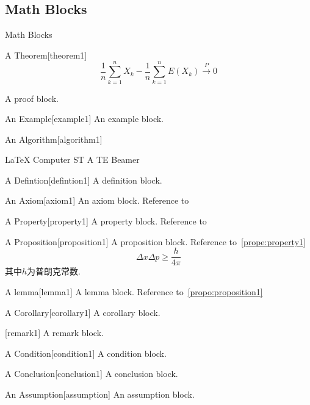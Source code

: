 \documentclass[hyperref, UTF8, CJK]{beamer}
\begin{document}
\subsection{Math Blocks}
\begin{frame}{Math Blocks}
	\begin{univtheorem}{A Theorem}[theorem1]
		\begin{equation}
		\dfrac{1}{n} \sum_{k=1}^{n} X_k - \dfrac{1}{n} \sum_{k=1}^{n} E(X_k) \stackrel{\;P\;}{\longrightarrow} 0
		\end{equation}
	\end{univtheorem}
	\begin{univproof}{}
		A proof block.
	\end{univproof}
	\begin{univexample}{An Example}[example1]
		An example block.
	\end{univexample}
	\begin{univalgorithm}{An Algorithm}[algorithm1]
		\begin{algorithmic}[1]
			\REQUIRE \LaTeX{}
			\ENSURE Computer
			\STATE ST
			\STATE A
			\STATE TE
			\RETURN Beamer
		\end{algorithmic}
	\end{univalgorithm}
	\begin{univdefinition}{A Defintion}[defintion1]
		A definition block.
	\end{univdefinition}
	\begin{univaxiom}{An Axiom}[axiom1]
		An axiom block. Reference to~
	\end{univaxiom}
	\begin{univproperty}{A Property}[property1]
		A property block. Reference to~
	\end{univproperty}
	\begin{univproposition}{A Proposition}[proposition1]
		A proposition block. Reference to~\vref{prope:property1}
		\begin{equation}
		\Delta x \Delta p \geq \dfrac{h}{4\pi}
		\end{equation}
		其中$h$为普朗克常数.
	\end{univproposition}
	\begin{univlemma}{A lemma}[lemma1]
		A lemma block. Reference to~\cref{propo:proposition1}
	\end{univlemma}
	\begin{univcorollary}{A Corollary}[corollary1]
		A corollary block.
	\end{univcorollary}
	\begin{univremark}{}[remark1]
		A remark block.
	\end{univremark}
	\begin{univcondition}{A Condition}[condition1]
		A condition block.
	\end{univcondition}
	\begin{univconclusion}{A Conclusion}[conclusion1]
		A conclusion block.
	\end{univconclusion}
	\begin{univassumption}{An Assumption}[assumption]
		An assumption block.
	\end{univassumption}
\end{frame}
\end{document}

